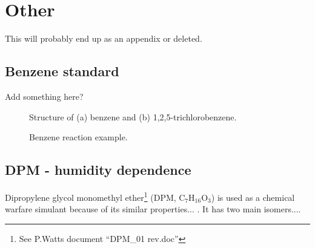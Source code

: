 \chapter{Other}
This will probably end up as an appendix or deleted.



\section{Benzene standard}
Add something here?



\begin{figure}
\qquad \qquad
  \caption{Structure of (a) benzene and (b) 1,2,5-trichlorobenzene.}
  \label{fig:bnz}
\end{figure}



\begin{figure}
\label{fig:bnzr}
\caption{Benzene reaction example.}
\end{figure}



\section{DPM - humidity dependence}

Dipropylene glycol monomethyl ether\footnote{See P.Watts document ``DPM\_01 rev.doc''} (DPM, C$_7$H$_{16}$O$_3$) is used as a chemical warfare simulant because of its similar properties... \cite{MUIR2004183}. It has two main isomers....

